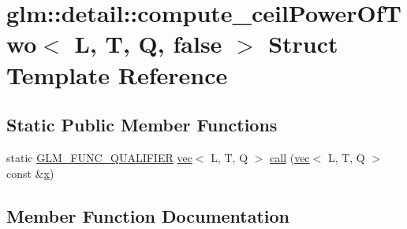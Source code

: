 \hypertarget{structglm_1_1detail_1_1compute__ceil_power_of_two_3_01_l_00_01_t_00_01_q_00_01false_01_4}{}\section{glm\+:\+:detail\+:\+:compute\+\_\+ceil\+Power\+Of\+Two$<$ L, T, Q, false $>$ Struct Template Reference}
\label{structglm_1_1detail_1_1compute__ceil_power_of_two_3_01_l_00_01_t_00_01_q_00_01false_01_4}
\subsection*{Static Public Member Functions}
\begin{DoxyCompactItemize}
\item 
static \mbox{\hyperlink{setup_8hpp_a33fdea6f91c5f834105f7415e2a64407}{G\+L\+M\+\_\+\+F\+U\+N\+C\+\_\+\+Q\+U\+A\+L\+I\+F\+I\+ER}} \mbox{\hyperlink{structglm_1_1vec}{vec}}$<$ L, T, Q $>$ \mbox{\hyperlink{structglm_1_1detail_1_1compute__ceil_power_of_two_3_01_l_00_01_t_00_01_q_00_01false_01_4_af5cd62b52c3d45c1d7e0e0f1b83a32b4}{call}} (\mbox{\hyperlink{structglm_1_1vec}{vec}}$<$ L, T, Q $>$ const \&\mbox{\hyperlink{_s_d_l__opengl_8h_ad0e63d0edcdbd3d79554076bf309fd47}{x}})
\end{DoxyCompactItemize}


\subsection{Member Function Documentation}
\mbox{\label{structglm_1_1detail_1_1compute__ceil_power_of_two_3_01_l_00_01_t_00_01_q_00_01false_01_4_af5cd62b52c3d45c1d7e0e0f1b83a32b4}} 
